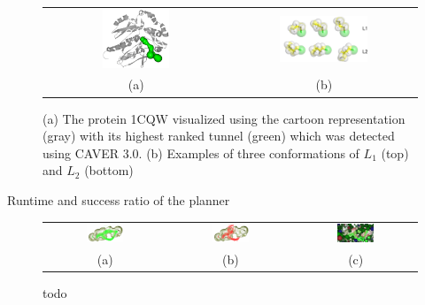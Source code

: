 \documentclass{svmult}
\def\LA{L_1}
\def\LB{L_2}
\begin{document}
\begin{figure}
\centering
\begin{tabular}{cc}
\includegraphics[width=0.38\textwidth]{fig/protein-tunnel-gray} &
\includegraphics[width=0.5\textwidth]{fig/ligAll}  \\
(a) & (b)                        
\end{tabular}                       
\caption{\label{fig::tunnel}
    (a) The protein 1CQW visualized using the cartoon representation (gray) with its highest ranked tunnel (green) which was detected using CAVER 3.0.
    (b) Examples of three conformations of $\LA$ (top) and $\LB$ (bottom)
}
\end{figure}

\begin{table}
\centering
\caption{\label{tab::rrt}
    Runtime and success ratio of the planner
}
{
\renewcommand{\tabcolsep}{1pt}

\hskip 5pt   

}
\end{table}




\begin{figure}
\centering
\begin{tabular}{ccc}
\includegraphics[width=0.32\textwidth]{fig/tunne4ac}& 
\includegraphics[width=0.32\textwidth]{fig/tunne4bc} & 
\includegraphics[width=0.32\textwidth]{fig/tunne4cc} \\
(a) & (b) & (c)                        
\end{tabular}
\caption{\label{fig::t4}
    todo
}
\end{figure}
\end{document}

